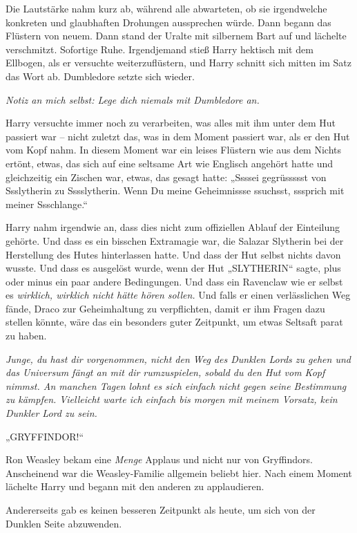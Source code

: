 Die Lautstärke nahm kurz ab, während alle abwarteten, ob sie irgendwelche konkreten und glaubhaften Drohungen aussprechen würde. Dann begann das Flüstern von neuem.
Dann stand der Uralte mit silbernem Bart auf und lächelte verschmitzt.
Sofortige Ruhe. Irgendjemand stieß Harry hektisch mit dem Ellbogen, als er versuchte weiterzuflüstern, und Harry schnitt sich mitten im Satz das Wort ab.
Dumbledore setzte sich wieder.

\emph{Notiz an mich selbst: Lege dich niemals mit Dumbledore an.}

Harry versuchte immer noch zu verarbeiten, was alles mit ihm unter dem Hut passiert war – nicht zuletzt das, was in dem Moment passiert war, als er den Hut vom Kopf nahm. In diesem Moment war ein leises Flüstern wie aus dem Nichts ertönt, etwas, das sich auf eine seltsame Art wie Englisch angehört hatte und gleichzeitig ein Zischen war, etwas, das gesagt hatte: „Ssssei gegrüssssst von Ssslytherin zu Sssslytherin. Wenn Du meine Geheimnissse ssuchsst, sssprich mit meiner Ssschlange.“

Harry nahm irgendwie an, dass dies nicht zum offiziellen Ablauf der Einteilung gehörte. Und dass es ein bisschen Extramagie war, die Salazar Slytherin bei der Herstellung des Hutes hinterlassen hatte. Und dass der Hut selbst nichts davon wusste. Und dass es ausgelöst wurde, wenn der Hut „SLYTHERIN“ sagte, plus oder minus ein paar andere Bedingungen. Und dass ein Ravenclaw wie er selbst es \emph{wirklich, wirklich nicht hätte hören sollen.} Und falls er einen verlässlichen Weg fände, Draco zur Geheimhaltung zu verpflichten, damit er ihm Fragen dazu stellen könnte, wäre das ein besonders guter Zeitpunkt, um etwas Seltsaft parat zu haben.

\emph{Junge, du hast dir vorgenommen, nicht den Weg des Dunklen Lords zu gehen und das Universum fängt an mit dir rumzuspielen, sobald du den Hut vom Kopf nimmst. An manchen Tagen lohnt es sich einfach nicht gegen seine Bestimmung zu kämpfen. Vielleicht warte ich einfach bis morgen mit meinem Vorsatz, kein Dunkler Lord zu sein.}

„GRYFFINDOR!“

Ron Weasley bekam eine \emph{Menge} Applaus und nicht nur von Gryffindors. Anscheinend war die Weasley-Familie allgemein beliebt hier. Nach einem Moment lächelte Harry und begann mit den anderen zu applaudieren.

Andererseits gab es keinen besseren Zeitpunkt als heute, um sich von der Dunklen Seite abzuwenden.

